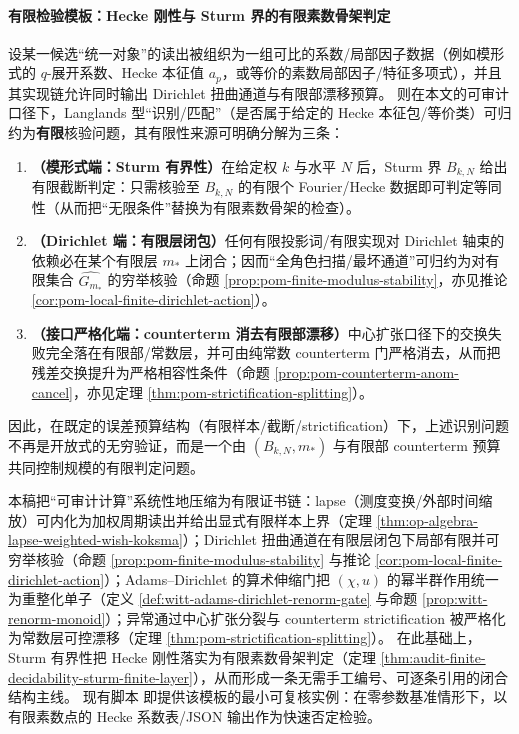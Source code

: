\paragraph{有限检验模板：Hecke 刚性与 Sturm 界的有限素数骨架判定}
\begin{theorem}\label{thm:audit-finite-decidability-sturm-finite-layer}
设某一候选“统一对象”的读出被组织为一组可比的系数/局部因子数据（例如模形式的 \(q\)-展开系数、Hecke 本征值 \(a_p\)，或等价的素数局部因子/特征多项式），并且其实现链允许同时输出 Dirichlet 扭曲通道与有限部漂移预算。
则在本文的可审计口径下，Langlands 型“识别/匹配”（是否属于给定的 Hecke 本征包/等价类）可归约为\textbf{有限}核验问题，其有限性来源可明确分解为三条：
\begin{enumerate}
  \item \textbf{（模形式端：Sturm 有界性）}在给定权 \(k\) 与水平 \(N\) 后，Sturm 界 \(B_{k,N}\) 给出有限截断判定：只需核验至 \(B_{k,N}\) 的有限个 Fourier/Hecke 数据即可判定等同性（从而把“无限条件”替换为有限素数骨架的检查）。
  \item \textbf{（Dirichlet 端：有限层闭包）}任何有限投影词/有限实现对 Dirichlet 轴束的依赖必在某个有限层 \(m_\ast\) 上闭合；因而“全角色扫描/最坏通道”可归约为对有限集合 \(\widehat{G_{m_\ast}}\) 的穷举核验（命题 \ref{prop:pom-finite-modulus-stability}，亦见推论 \ref{cor:pom-local-finite-dirichlet-action}）。
  \item \textbf{（接口严格化端：counterterm 消去有限部漂移）}中心扩张口径下的交换失败完全落在有限部/常数层，并可由纯常数 counterterm 门严格消去，从而把残差交换提升为严格相容性条件（命题 \ref{prop:pom-counterterm-anom-cancel}，亦见定理 \ref{thm:pom-strictification-splitting}）。
\end{enumerate}
因此，在既定的误差预算结构（有限样本/截断/strictification）下，上述识别问题不再是开放式的无穷验证，而是一个由 \((B_{k,N},m_\ast)\) 与有限部 counterterm 预算共同控制规模的有限判定问题。
\end{theorem}

\begin{remark}\label{rem:audit-summary-lapse-dirichlet-adams-sturm}
本稿把“可审计计算”系统性地压缩为有限证书链：lapse（测度变换/外部时间缩放）可内化为加权周期读出并给出显式有限样本上界（定理 \ref{thm:op-algebra-lapse-weighted-wish-koksma}）；Dirichlet 扭曲通道在有限层闭包下局部有限并可穷举核验（命题 \ref{prop:pom-finite-modulus-stability} 与推论 \ref{cor:pom-local-finite-dirichlet-action}）；Adams--Dirichlet 的算术伸缩门把 \((\chi,u)\) 的幂半群作用统一为重整化单子（定义 \ref{def:witt-adams-dirichlet-renorm-gate} 与命题 \ref{prop:witt-renorm-monoid}）；异常通过中心扩张分裂与 counterterm strictification 被严格化为常数层可控漂移（定理 \ref{thm:pom-strictification-splitting}）。
在此基础上，Sturm 有界性把 Hecke 刚性落实为有限素数骨架判定（定理 \ref{thm:audit-finite-decidability-sturm-finite-layer}），从而形成一条无需手工编号、可逐条引用的闭合结构主线。
现有脚本 \texttt{} 即提供该模板的最小可复核实例：在零参数基准情形下，以有限素数点的 Hecke 系数表/JSON 输出作为快速否定检验。
\end{remark}

